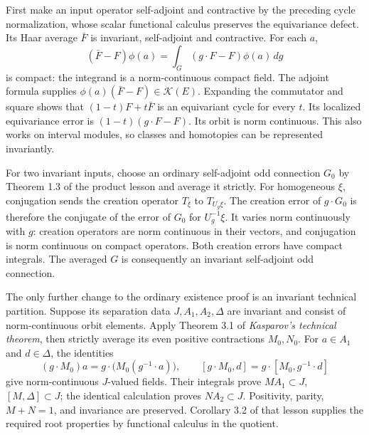 \documentclass[
  11pt,
]{article}
\begin{document}
First make an input operator self-adjoint and contractive by the
preceding cycle normalization, whose scalar functional calculus
preserves the equivariance defect. Its Haar average \(\bar F\) is
invariant, self-adjoint and contractive. For each \(a\), \[
(\bar F-F)\phi(a)=\int_G(g\cdot F-F)\phi(a)\,dg
\] is compact: the integrand is a norm-continuous compact field. The
adjoint formula supplies \(\phi(a)(\bar F-F)\in\mathcal K(E)\).
Expanding the commutator and square shows that \((1-t)F+t\bar F\) is an
equivariant cycle for every \(t\). Its localized equivariance error is
\((1-t)(g\cdot F-F)\). Its orbit is norm continuous. This also works on
interval modules, so classes and homotopies can be represented
invariantly.

For two invariant inputs, choose an ordinary self-adjoint odd connection
\(G_0\) by Theorem 1.3 of the product lesson and average it strictly.
For homogeneous \(\xi\), conjugation sends the creation operator
\(T_\xi\) to \(T_{U_g\xi}\). The creation error of \(g\cdot G_0\) is
therefore the conjugate of the error of \(G_0\) for \(U_g^{-1}\xi\). It
varies norm continuously with \(g\): creation operators are norm
continuous in their vectors, and conjugation is norm continuous on
compact operators. Both creation errors have compact integrals. The
averaged \(G\) is consequently an invariant self-adjoint odd connection.

The only further change to the ordinary existence proof is an invariant
technical partition. Suppose its separation data \(J,A_1,A_2,\Delta\)
are invariant and consist of norm-continuous orbit elements. Apply
Theorem 3.1 of \emph{Kasparov's technical theorem}, then strictly
average its even positive contractions \(M_0,N_0\). For \(a\in A_1\) and
\(d\in\Delta\), the identities \[
(g\cdot M_0)a=g\cdot\bigl(M_0(g^{-1}\cdot a)\bigr),\qquad
[g\cdot M_0,d]=g\cdot[M_0,g^{-1}\cdot d]
\] give norm-continuous \(J\)-valued fields. Their integrals prove
\(MA_1\subset J\), \([M,\Delta]\subset J\); the identical calculation
proves \(NA_2\subset J\). Positivity, parity, \(M+N=1\), and invariance
are preserved. Corollary 3.2 of that lesson supplies the required root
properties by functional calculus in the quotient.
\end{document}
